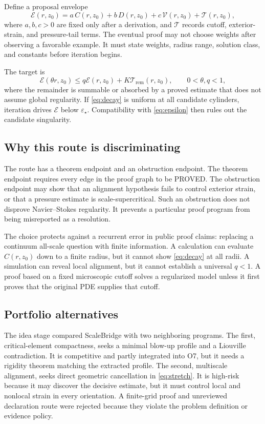 \documentclass[conference]{../../../../Conference-LaTeX-template_10-17-19/IEEEtran}
\begin{document}
Define a proposal envelope
\begin{equation}
\mathcal E(r,z_0)=
a\,C(r,z_0)+b\,D(r,z_0)+c\,\mathcal V(r,z_0)+\mathcal T(r,z_0),
\label{eq:envelope}
\end{equation}
where $a,b,c>0$ are fixed only after a derivation, and $\mathcal T$ records cutoff, exterior-strain, and pressure-tail terms. The eventual proof may not choose weights after observing a favorable example. It must state weights, radius range, solution class, and constants before iteration begins.

The target is
\begin{equation}
\mathcal E(\theta r,z_0)\le q\mathcal E(r,z_0)
+K\mathcal T_{\mathrm{rem}}(r,z_0),
\qquad 0<\theta,q<1,
\label{eq:decay}
\end{equation}
where the remainder is summable or absorbed by a proved estimate that does not assume global regularity. If \eqref{eq:decay} is uniform at all candidate cylinders, iteration drives $\mathcal E$ below $\varepsilon_\star$. Compatibility with \eqref{eq:epsilon} then rules out the candidate singularity.

\subsection{Why this route is discriminating}
The route has a theorem endpoint and an obstruction endpoint. The theorem endpoint requires every edge in the proof graph to be PROVED. The obstruction endpoint may show that an alignment hypothesis fails to control exterior strain, or that a pressure estimate is scale-supercritical. Such an obstruction does not disprove Navier--Stokes regularity. It prevents a particular proof program from being misreported as a resolution.

The choice protects against a recurrent error in public proof claims: replacing a continuum all-scale question with finite information. A calculation can evaluate $C(r,z_0)$ down to a finite radius, but it cannot show \eqref{eq:decay} at all radii. A simulation can reveal local alignment, but it cannot establish a universal $q<1$. A proof based on a fixed microscopic cutoff solves a regularized model unless it first proves that the original PDE supplies that cutoff.

\subsection{Portfolio alternatives}
The idea stage compared ScaleBridge with two neighboring programs. The first, critical-element compactness, seeks a minimal blow-up profile and a Liouville contradiction. It is competitive and partly integrated into O7, but it needs a rigidity theorem matching the extracted profile. The second, multiscale alignment, seeks direct geometric cancellation in \eqref{eq:stretch}. It is high-risk because it may discover the decisive estimate, but it must control local and nonlocal strain in every orientation. A finite-grid proof and unreviewed declaration route were rejected because they violate the problem definition or evidence policy.
\end{document}
